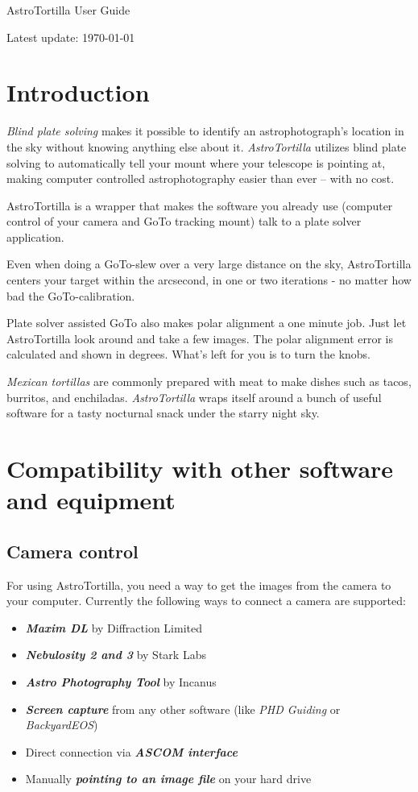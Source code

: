 \documentclass[english]{article}
\begin{document}
\centerline{\sf \Huge AstroTortilla User Guide}
\centerline{Latest update: \today}

\tableofcontents

\setlength{\parindent}{0pt}
\setlength{\parskip}{2ex}


\newpage

\section{Introduction}

\emph{Blind plate solving} makes it possible to identify an astrophotograph's location in the sky without knowing anything else about it. \emph{AstroTortilla} utilizes blind plate solving to automatically tell your mount where your telescope is pointing at, making computer controlled astrophotography easier than ever -- with no cost.

AstroTortilla is a wrapper that makes the software you already use (computer control of your camera and GoTo tracking mount) talk to a plate solver application.

Even when doing a GoTo-slew over a very large distance on the sky, AstroTortilla centers your target within the arcsecond, in one or two iterations - no matter how bad the GoTo-calibration.

Plate solver assisted GoTo also makes polar alignment a one minute job. Just let AstroTortilla look around and take a few images. The polar alignment error is calculated and shown in degrees. What's left for you is to turn the knobs.

\emph{Mexican tortillas} are commonly prepared with meat to make dishes such as
tacos, burritos, and enchiladas. \emph{AstroTortilla} wraps itself around a
bunch of useful software for a tasty nocturnal snack under the starry night
sky.


\section{Compatibility with other software and equipment} \subsection{Camera
control}

For using AstroTortilla, you need a way to get the images from the camera to your computer. Currently the following ways to connect a camera are supported:
\begin{itemize}
\item \textbf{\emph{Maxim DL}} by Diffraction Limited
\item \textbf{\emph{Nebulosity 2 and 3}} by Stark Labs
\item \textbf{\emph{Astro Photography Tool}} by Incanus
\item \textbf{\emph{Screen capture}} from any other software (like \emph{PHD Guiding} or \emph{BackyardEOS})
\item Direct connection via \textbf{\emph{ASCOM interface}}
\item Manually \textbf{\emph{pointing to an image file}} on your hard drive
\end{itemize}
\end{document}
